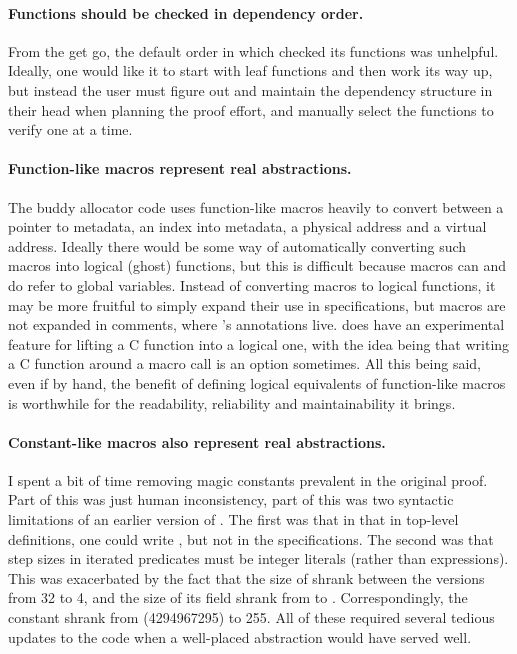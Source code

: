 \paragraph{Functions should be checked in dependency order.} From the get go,
the default order in which  checked its functions was unhelpful.
Ideally, one would like it to start with leaf functions and then work its way
up, but instead the user must figure out and maintain the dependency structure
in their head when planning the proof effort, and manually select the functions
to verify one at a time.

\paragraph{Function-like macros represent real abstractions.} The buddy allocator code
uses function-like macros heavily to convert between a pointer to metadata, an
index into metadata, a physical address and a virtual address. Ideally there
would be some way of automatically converting such macros into logical (ghost)
functions, but this is difficult because macros can and do refer to global
variables. Instead of converting macros to logical functions, it may be more
fruitful to simply expand their use in specifications, but macros are not
expanded in comments, where 's annotations live.
 does have an experimental feature for lifting a C function into a
logical one, with the idea being that writing a C function around a macro call
is an option sometimes. All this being said, even if by hand, the benefit of
defining logical equivalents of function-like macros is worthwhile for the
readability, reliability and maintainability it brings.

\paragraph{Constant-like macros also represent real abstractions.} I spent a
bit of time removing magic constants prevalent in the original proof. Part of
this was just human inconsistency, part of this was two syntactic limitations
of an earlier version of . The first was that in that in top-level
definitions, one could write , but not in the
specifications. The second was that step sizes in iterated predicates must be
integer literals (rather than  expressions). This was
exacerbated by the fact that the size of  shrank
between the versions from 32 to 4, and the size of its  field
shrank from  to . Correspondingly, the constant
 shrank from  (4294967295) to 255. All
of these required several tedious updates to the code when a well-placed
abstraction would have served well.

